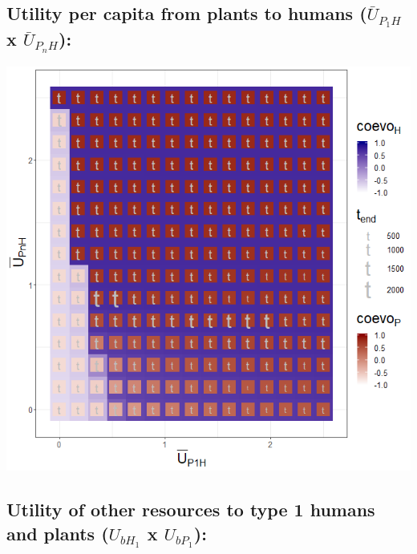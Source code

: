 \documentclass[]{book}
\begin{document}
\newpage

\hypertarget{utility-per-capita-from-plants-to-humans-baru_p_1h-x-baru_p_nh}{%
\subsection{\texorpdfstring{Utility per capita from plants to humans (\(\bar{U}_{P_{1}H}\) x \(\bar{U}_{P_{n}H}\)):}{Utility per capita from plants to humans (\textbackslash{}bar\{U\}\_\{P\_\{1\}H\} x \textbackslash{}bar\{U\}\_\{P\_\{n\}H\}):}}\label{utility-per-capita-from-plants-to-humans-baru_p_1h-x-baru_p_nh}}

\includegraphics[width=1\linewidth]{plots/3_twoPar-mU.P1H-mU.PnH_plot}

\newpage

\hypertarget{utility-of-other-resources-to-type-1-humans-and-plants-u_bh_1-x-u_bp_1}{%
\subsection{\texorpdfstring{Utility of other resources to type 1 humans and plants (\(U_{bH_{1}}\) x \(U_{bP_{1}}\)):}{Utility of other resources to type 1 humans and plants (U\_\{bH\_\{1\}\} x U\_\{bP\_\{1\}\}):}}\label{utility-of-other-resources-to-type-1-humans-and-plants-u_bh_1-x-u_bp_1}}
\end{document}
